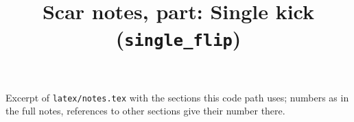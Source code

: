 \documentclass[11pt,a4paper]{article}
\title{Scar notes, part: Single kick (\texttt{single\_flip})}
\begin{document}
\maketitle
\noindent Excerpt of \texttt{latex/notes.tex} with the sections this code path uses; numbers as in the full notes, references to other sections give their number there.

\tableofcontents

\end{document}
